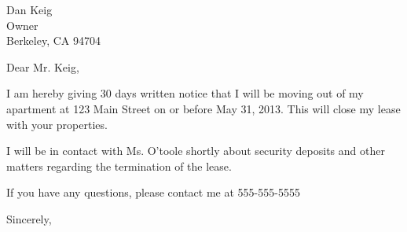 \documentclass[
	pagenumber=false, %
	parskip=full, %
	fromalign=right, %
	foldmarks=true, %
	addrfield=true %
	]{scrlttr2}
\date{\today} %
\begin{document}
 
\begin{letter}{Dan Keig \\ Owner \\ Berkeley, CA 94704} %


\opening{Dear Mr. Keig,} %
I am hereby giving 30 days written notice that I will be moving out of my apartment at 123 Main Street on or before May 31, 2013. This will close my lease with your properties. 

I will be in contact with Ms. O'toole shortly about security deposits and other matters regarding the termination of the lease.

If you have any questions, please contact me at 555-555-5555



\closing{Sincerely,}



\end{letter}
 
\end{document}
